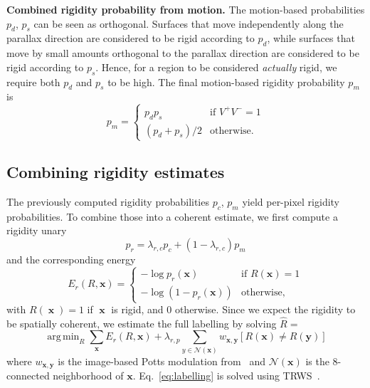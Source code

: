 \documentclass[10pt,twocolumn,letterpaper]{article}
\DeclareMathOperator*{\argmin}{arg\,min}
\DeclareMathOperator{\x}{\mathbf{x}}
\begin{document}
\noindent
{\bf Combined rigidity probability from motion.}
The motion-based probabilities $p_d$, $p_s$ can be seen as orthogonal. Surfaces that move independently along the parallax direction are considered to be rigid according to $p_d$, while surfaces that move by small amounts orthogonal to the parallax direction are considered to be rigid according to $p_s$.
Hence, for a region to be considered \textit{actually} rigid, we require both $p_d$ and $p_s$ to be high.
The final motion-based rigidity probability $p_m$ is
\begin{equation}
p_{m} =
\begin{cases}
	p_d p_s & \text{if } V^+ V^- = 1 \\
	(p_d + p_s) / 2 &\text{otherwise.}
\end{cases}
\end{equation}

\subsection{Combining rigidity estimates}
\noindent
The previously computed rigidity probabilities $p_{c}$, $p_{m}$
yield per-pixel rigidity probabilities.
To combine those into a coherent estimate, we first compute a rigidity unary
\begin{equation}
p_r = \lambda_{r,c} p_c + \left( 1- \lambda_{r,c} \right) p_m
\label{eq:rigidity_unaries}
\end{equation}
and the corresponding energy
\begin{equation}
E_r(R, \mathbf{x}) =
\begin{cases}
	-\log p_{r}(\mathbf{x}) &\text{if } R(\mathbf{x}) = 1 \\
	-\log \left( 1 - p_{r}(\mathbf{x}) \right) &\text{otherwise, }
\end{cases}
\end{equation}
with $R(\x) = 1$ if $\x$ is rigid, and 0 otherwise.
Since we expect the rigidity to be spatially coherent, 
we estimate the full labelling by solving $\hat{R} =$
\begin{equation}
\argmin_{R}
\sum_\mathbf{x}
E_r \left( R, \mathbf{x} \right)
+ \lambda_{r,p} \sum_{y\in \mathcal{N}(\mathbf{x})} w_{\mathbf{x},\mathbf{y}} \left[ R(\mathbf{x}) \neq R(\mathbf{y}) \right]
\label{eq:labelling}
\end{equation}
where $w_{\mathbf{x},\mathbf{y}}$ is the image-based Potts modulation from~\cite{Rother:Grabcut} and $\mathcal{N}(\mathbf{x})$ is the 8-connected neighborhood of $\mathbf{x}$.
Eq.~\eqref{eq:labelling} is solved using TRWS~\cite{TRWS}.
\end{document}
